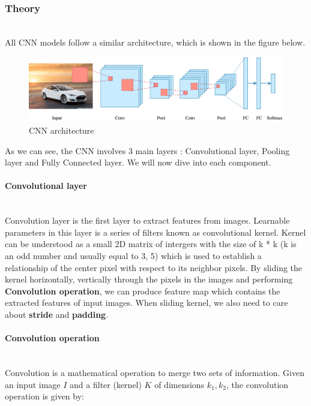 \documentclass[runningheads]{llncs}
\begin{document}
\subsubsection{\large Theory}\hspace*{\fill} \\
All CNN models follow a similar architecture, which is shown in the figure below.
\begin{figure}[H]
    \centering
    \includegraphics[width=\textwidth]{Figures/cnn.png}
    \caption{CNN architecture}
    \label{fig:cnn}
\end{figure}
As we can see, the CNN involves 3 main layers : Convolutional layer, Pooling layer and Fully Connected layer. We will now dive into each component.

\paragraph{\large\bf Convolutional layer}\hspace*{\fill} \\
Convolution layer is the first layer to extract features from images. Learnable parameters in this layer is a series of filters known as convolutional kernel. Kernel can be understood as a small 2D matrix of intergers with the size of k * k (k is an odd number and usually equal to 3, 5) which is used to establish a relationship of the center pixel with respect to its neighbor pixels. By sliding the kernel horizontally, vertically through the pixels in the images and performing \textbf{Convolution operation}, we can produce feature map which contains the extracted features of input images. When sliding kernel, we also need to care about \textbf{stride} and \textbf{padding}.
\vspace{2cm}

\paragraph{\bf Convolution operation}\hspace*{\fill} \\
Convolution is a mathematical operation to merge two sets of information. Given an input image $I$ and a filter (kernel) $K$ of dimensions $k_{1}, k_{2}$, the convolution operation is given by:
\end{document}
